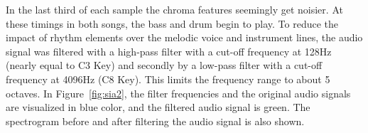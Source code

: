 \noindent In the last third of each sample the chroma features seemingly get noisier. At these timings in both songs, the bass and drum begin to play. To reduce the impact of rhythm elements over the melodic voice and instrument lines, the audio signal was filtered with a high-pass filter with a cut-off frequency at 128Hz (nearly equal to C3 Key) and secondly by a low-pass filter with a cut-off frequency at 4096Hz (C8 Key). This limits the frequency range to about 5 octaves. 
In Figure~\ref{fig:sia2}, the filter frequencies and the original audio signals are visualized in blue color, and the filtered audio signal is green. The spectrogram before and after filtering the audio signal is also shown. 
\begin{figure}[htbp]
	\centering
\end{figure}
